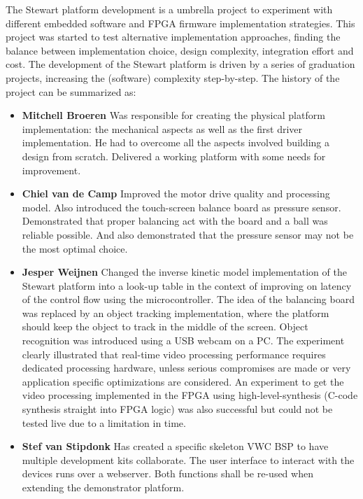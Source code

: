 \documentclass{article}
\begin{document}
The Stewart platform development is a umbrella project to experiment with
different embedded software and FPGA firmware implementation strategies. This project was started to 
test alternative implementation approaches, finding the balance between
implementation choice, design complexity, integration effort and cost. The
development of the Stewart platform is driven by a series of graduation projects,
increasing the (software) complexity step-by-step. The history of the project
can be summarized as: 
\begin{itemize} 
    \item[] \textbf{Mitchell Broeren} Was
        responsible for creating the physical platform implementation: the mechanical
        aspects as well as the first driver implementation. He had to overcome all the
        aspects involved building a design from scratch. Delivered a working platform
        with some needs for improvement.
    \item[]\textbf{Chiel van de
        Camp} Improved the motor drive quality and processing model. Also introduced the
        touch-screen balance board as pressure sensor. Demonstrated that proper
        balancing act with the board and a ball was reliable possible. And also
        demonstrated that the pressure sensor may not be the most optimal choice.
    \item[]\textbf{Jesper Weijnen} Changed the inverse kinetic model implementation
        of the Stewart platform into a look-up table in the context of improving on
        latency of the control flow using the microcontroller. The idea of the balancing
        board was replaced by an object tracking implementation, where the platform
        should keep the object to track in the middle of the screen. Object recognition
        was introduced using a USB webcam on a PC\@. The experiment clearly illustrated
        that real-time video processing performance requires dedicated processing
        hardware, unless serious compromises are made or very application specific
        optimizations are considered. An experiment to get the video processing
        implemented in the FPGA using high-level-synthesis (C-code synthesis straight
        into FPGA logic) was also successful but could not be tested live due to a
        limitation in time. 
    \item[]\textbf{Stef van Stipdonk} Has created a specific
        skeleton VWC BSP to have multiple development kits collaborate. The user
        interface to interact with the devices runs over a webserver. Both functions
shall be re-used when extending the demonstrator platform. \end{itemize}
\end{document}
